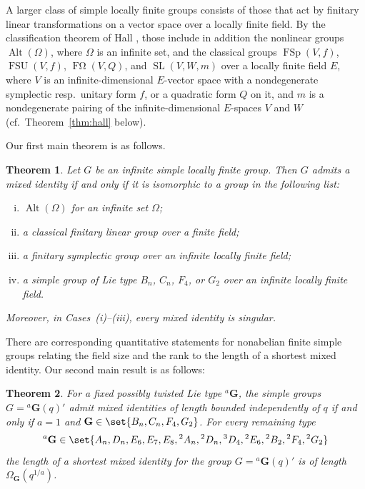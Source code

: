 \documentclass[a4paper,12pt]{amsproc}
\DeclareMathOperator{\SL}{SL}%
\DeclareMathOperator{\Alt}{Alt}%
\DeclareMathOperator{\FSp}{FSp}%
\DeclareMathOperator{\FOmega}{F\Omega}%
\DeclareMathOperator{\FSU}{FSU}%
\theoremstyle{plain}
\newtheorem{thmintro}{Theorem}
\theoremstyle{definition}
\begin{document}
A larger class of simple locally finite groups consists of those that act by finitary linear transformations on a vector space over a locally finite field. By the classification theorem of  Hall \cite{hall2006periodic}, those include in addition the nonlinear groups
$\Alt(\Omega)$, where $\Omega$ is an infinite set, and the classical groups $\FSp(V,f)$, $\FSU(V,f)$, $\FOmega(V,Q)$, and $\SL(V,W,m)$ over a locally finite field $E$, where $V$ is an infinite-dimensional $E$-vector space with a nondegenerate symplectic resp.\ unitary form $f$, or a quadratic form $Q$ on it, and $m$ is a nondegenerate pairing of the infinite-dimensional
$E$-spaces $V$ and $W$ (cf.\ Theorem~\ref{thm:hall} below).

\medskip

Our first main theorem is as follows.

\begin{thmintro}\label{thm:main}
Let $G$ be an infinite simple locally finite group. Then $G$ admits a mixed identity if and only if it is isomorphic to a group in the following list:
\begin{enumerate}[(i)]
\item $\Alt(\Omega)$ for an infinite set $\Omega$;
\item a classical finitary linear group over a finite field;
\item a finitary symplectic group over an infinite locally finite field;
\item a simple group of Lie type $B_n$, $C_n$, $F_4$, or $G_2$ over an infinite locally finite field.
\end{enumerate}
Moreover, in  Cases~(i)--(iii), every mixed identity is singular.
\end{thmintro}

There are corresponding quantitative statements for nonabelian finite simple groups relating the field size and the rank to the length of a shortest mixed identity. Our second main result is as follows:

\begin{thmintro}\label{thm:main_finintro}
For a fixed possibly twisted Lie type ${}^a\mathbf{G}$, the simple groups $G={}^a\mathbf{G}(q)'$ admit
mixed identities of length bounded independently of $q$ if and only if
$a=1$ and $\mathbf{G}\in\set{B_n,C_n,F_4,G_2}$. For every remaining type 
$$
{}^a\mathbf{G}\in\set{A_n, D_n, E_6, E_7, E_8, 
{}^2A_n, {}^2D_n, {}^3D_4, {}^2E_6, {}^2B_2, {}^2F_4, {}^2G_2}
$$ 
the length of a shortest mixed identity for the group $G={}^a\mathbf{G}(q)'$ is of length $\Omega_{\mathbf{G}}(q^{1/a})$.
\end{thmintro}
\end{document}

